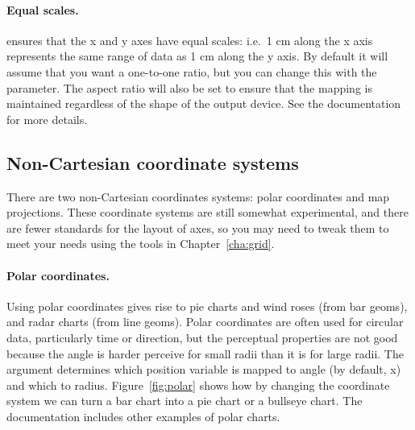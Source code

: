 % 


\paragraph{Equal scales.}   ensures that the x and y axes have equal scales: i.e.\ 1 cm along the x axis represents the same range of data as 1 cm along the y axis.  By default it will assume that you want a one-to-one ratio, but you can change this with the  parameter.  The aspect ratio will also be set to ensure that the mapping is maintained regardless of the shape of the output device.  See the documentation for more details.

\subsection{Non-Cartesian coordinate systems}

There are two non-Cartesian coordinates systems: polar coordinates and map projections.  These coordinate systems are still somewhat experimental, and there are fewer standards for the layout of axes, so you may need to tweak them to meet your needs using the tools in Chapter~\ref{cha:grid}.

\paragraph{Polar coordinates.}  Using polar coordinates gives rise to pie charts and wind roses (from bar geoms), and radar charts (from line geoms).  Polar coordinates are often used for circular data, particularly time or direction, but the perceptual properties are not good because the angle is harder perceive for small radii than it is for large radii.  The  argument determines which position variable is mapped to angle (by default, x) and which to radius.  Figure~\ref{fig:polar} shows how by changing the coordinate system we can turn a bar chart into a pie chart or a bullseye chart.  The documentation includes other examples of polar charts.


